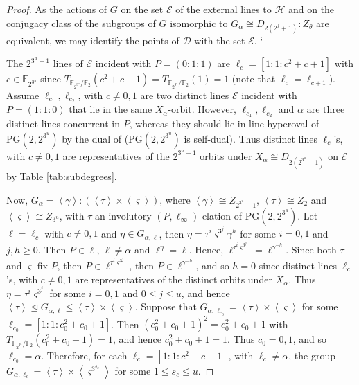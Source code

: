 \documentclass[a4paper,twopage,reqno,12pt]{amsart}
\theoremstyle{definition}
\numberwithin{equation}{section}
\newcommand{\PG}{\mathrm{PG}}
\renewcommand{\leq}{\leqslant}
\renewcommand{\geq}{\geqslant}
\begin{document}
\begin{proof}
As the actions of $G$ on the set $\mathcal{E}$ of the external lines to $\mathcal{H}$ and on
the conjugacy class of the subgroups of $G$ isomorphic to $G_{\alpha }\cong
D_{2(2^{f}+1)}:Z_{\theta }$ are equivalent, we may identify the points of $\mathcal{D%
}$ with the set $\mathcal{E}$.  `

The $2^{3^u-1}$ lines of $\mathcal{E}$ incident with $P=(0:1:1)$ are $\ell_{c}=[1:1:c^2+c+1]$ with $c\in \mathbb{F}_{2^{3^u}}$ since $T_{\mathbb{F}_{2^{3^{u}}}/%
\mathbb{F}_{2}}(c^2+c+1)=T_{\mathbb{F}_{2^{3^{u}}}/%
\mathbb{F}_{2}}(1)=1$ (note that $\ell_{c}=\ell_{c+1}$).
Assume $\ell_{c_{1}}, \ell_{c_{2}}$, with $c\neq 0,1$ are two distinct lines $\mathcal{E}$ incident with $P=(1:1:0)$ that lie in the same $X_{\alpha}$-orbit. However, $\ell_{c_{1}}, \ell_{c_{2}}$ and $\alpha$ are three distinct lines concurrent in $P$, whereas they should lie in line-hyperoval of $\PG(2,2^{3^{u}})$ by the dual of \cite[Lemma 3.2]{OKP} ($\PG(2,2^{3^{u}})$ is self-dual). Thus distinct lines $\ell_{c}$'s, with $c\neq 0,1$ are representatives of the $2^{3^u-1}$ orbits under $X_{\alpha} \cong D_{2(2^{3^u}-1)}$ on $\mathcal{E}$ by Table \ref{tab:subdegrees}. 

Now, $G_{\alpha}=\left\langle \gamma \right\rangle: \left( \left\langle \tau \right\rangle \times \left\langle \varsigma \right\rangle \right)$, where $\left\langle \gamma \right\rangle \cong Z_{2^{3^u}-1}$, $\left\langle \tau \right\rangle \cong Z_{2}$ and $\left\langle \varsigma \right\rangle \cong Z_{3^{u}}$, with $\tau$ an involutory $\left(P,\ell_{\infty}\right)$-elation of $\PG(2,2^{3^{u}})$. Let $\ell=\ell_{c}$ with $c\neq 0,1$ and $\eta \in G_{\alpha,\ell}$, then $\eta=\tau^{i}\varsigma^{3^{j}}\gamma^{h}$ for some $i=0,1$ and $j,h \geq 0$. Then $P \in \ell$, $\ell \neq \alpha$ and $\ell^\eta=\ell$. Hence, $\ell^{\tau^{i}\varsigma^{3^{j}}}=\ell^{\gamma^{-h}}$. Since both $\tau$ and $\varsigma$ fix $P$, then $P\in \ell^{\tau^{i}\varsigma^{3^{j}}}$, then $P \in \ell^{\gamma^{-h}}$, and so $h=0$ since distinct lines $\ell_{c}$'s, with $c\neq 0,1$ are representatives of the distinct orbits under $X_{\alpha}$. Thus $\eta=\tau^{i}\varsigma^{3^{j}}$ for some $i=0,1$ and $0 \leq j \leq u$, and hence $\left\langle \tau \right\rangle \unlhd G_{\alpha, \ell} \leq  \left\langle \tau \right\rangle \times \left\langle \varsigma \right\rangle $. Suppose that $G_{\alpha, \ell_{c_{0}}} = \left\langle \tau \right\rangle \times \left\langle \varsigma \right\rangle$ for some $\ell_{c_{0}}=[1:1:c_{0}^2+c_{0}+1]$. Then $(c_{0}^2+c_{0}+1)^{2}=c_{0}^2+c_{0}+1$ with $T_{\mathbb{F}_{2^{3^{u}}}/\mathbb{F}_{2}}(c_{0}^2+c_{0}+1)=1$, and hence $c_{0}^2+c_{0}+1=1$. Thus $c_{0}=0,1$, and so $\ell_{c_{0}}=\alpha$. Therefore, for each $\ell_{c}=[1:1:c^2+c+1]$, with $\ell_{c}\neq \alpha$, the group $G_{\alpha, \ell_{c}}=\left\langle \tau \right\rangle \times \left\langle \varsigma^{3^{s_{c}}} \right\rangle$ for some $1\leq s_{c} \leq u$.


\end{proof}
\end{document}
